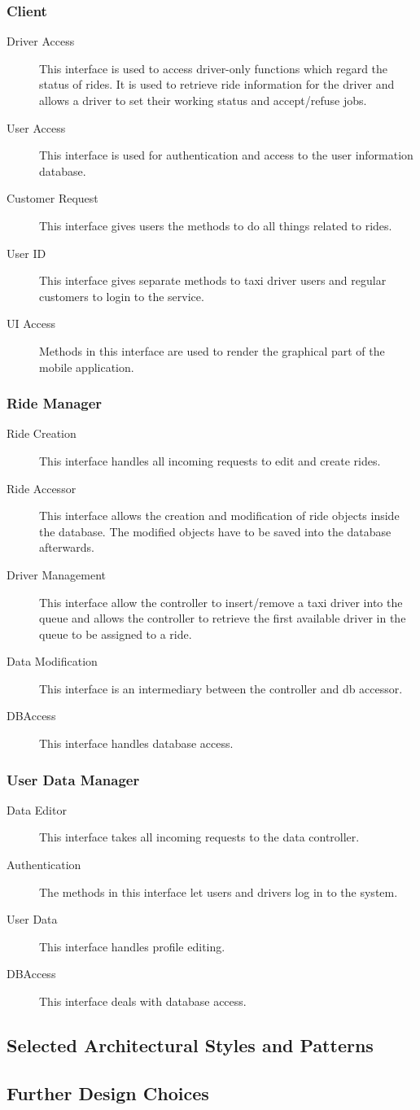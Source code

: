 	\subsubsection{Client}
		\begin{description}
			\item[Driver Access]
				This interface is used to access driver-only functions which regard the status of rides. It is used to retrieve ride information for the driver and allows a driver to set their working
				status and accept/refuse jobs.
			\item[User Access]
				This interface is used for authentication and access to the user information database.
			\item[Customer Request]
				This interface gives users the methods to do all things related to rides.
			\item[User ID]
				This interface gives separate methods to taxi driver users and regular customers to login to the service.
			\item[UI Access]
				Methods in this interface are used to render the graphical part of the mobile application.
		\end{description}
	\subsubsection{Ride Manager}
		\begin{description}
			\item[Ride Creation]
				This interface handles all incoming requests to edit and create rides.
			\item[Ride Accessor]
				This interface allows the creation and modification of ride objects inside the database. The modified objects have to be saved into the database afterwards.
			\item[Driver Management]
				This interface allow the controller to insert/remove a taxi driver into the queue and allows the controller to retrieve the first available driver in the queue to be assigned to
				a ride.
			\item[Data Modification]
				This interface is an intermediary between the controller and db accessor.
			\item[DBAccess]
				This interface handles database access.
		\end{description}
	\subsubsection{User Data Manager}
		\begin{description}
			\item[Data Editor]
				This interface takes all incoming requests to the data controller.
			\item[Authentication]
				The methods in this interface let users and drivers log in to the system.
			\item[User Data]
				This interface handles profile editing.
			\item[DBAccess]
				This interface deals with database access.
		\end{description}
\subsection{Selected Architectural Styles and Patterns}

\subsection{Further Design Choices}
